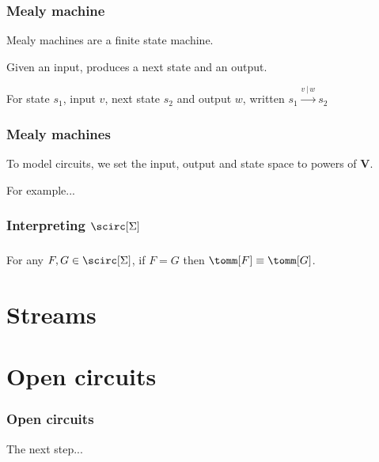 \documentclass[aspectratio=169]{beamer}
\begin{document}
    \begin{frame}
        \frametitle{Mealy machine}

        Mealy machines are a \alert{finite state machine}.

        \pause

        Given an input, produces a \alert{next state} and an \alert{output}.
        
        \pause

        For state $s_1$, input $v$, next state $s_2$ and output $w$, written $s_1 \xrightarrow{v \,|\, w} s_2$

    \end{frame}

    \begin{frame}
        \frametitle{Mealy machines}
    
        To model circuits, we set the input, output and state space to powers of $\textbf{V}$.

        \pause

        For example...

        \pause

        \begin{center}
            
        \end{center}
    
    \end{frame}


    \begin{frame}
        \frametitle{Interpreting $\scirc[\Sigma]$}
    
        
    
    \end{frame}

    \begin{frame}
        \frametitle{}
    
        \begin{theorem}
            For any $F,G \in \scirc[\Sigma]$, if $F = G$ then $\tomm[F] \equiv \tomm[G]$.
        \end{theorem}
    
    \end{frame}

    \section{Streams}

    \section{Open circuits}

    \begin{frame}
        \frametitle{Open circuits}
    
        The next step...
    
    \end{frame}
\end{document}

